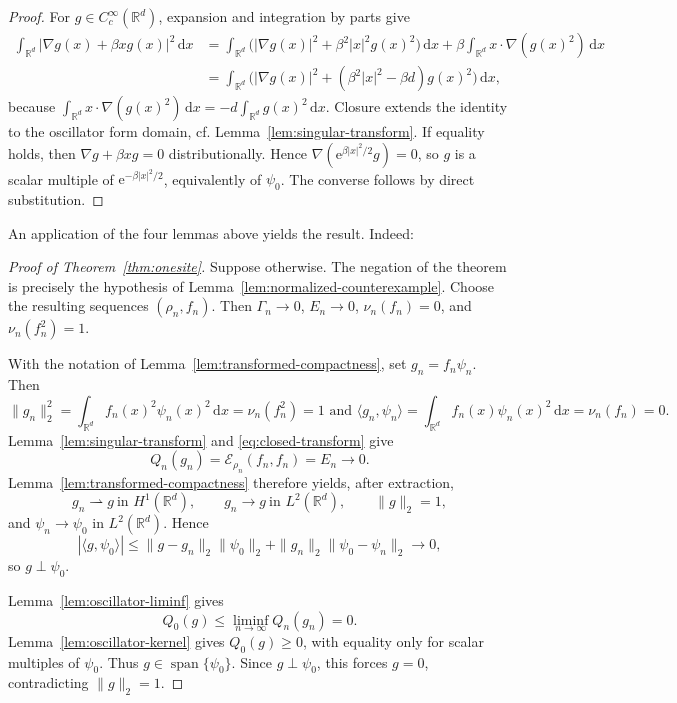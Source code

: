 \documentclass[12pt,reqno,letterpaper]{amsart}
\theoremstyle{definition}
\theoremstyle{remark}
\numberwithin{equation}{section}
\newcommand{\R}{\mathbb R}
\newcommand{\dd}{\,\mathrm d}
\newcommand{\ee}{\mathrm e}
\newcommand{\be}{\beta}
\newcommand{\cE}{\mathcal E}
\begin{document}
\begin{proof}
For \(g\in C_c^\infty(\R^d)\), expansion and integration by parts give
\begin{align*}
 \int_{\R^d}|\nabla g(x)+\be xg(x)|^2\dd x
 &=\int_{\R^d}\bigl(|\nabla g(x)|^2+\be^2|x|^2g(x)^2\bigr)\dd x+\be\int_{\R^d}x\cdot\nabla(g(x)^2)\dd x\\
 &=\int_{\R^d}\bigl(|\nabla g(x)|^2+
   (\be^2|x|^2-\be d)g(x)^2\bigr)\dd x,
\end{align*}
because
\(\int_{\R^d}x\cdot\nabla(g(x)^2)\dd x
=-d\int_{\R^d}g(x)^2\dd x\).  Closure extends the identity to the
oscillator form domain, cf. Lemma~\ref{lem:singular-transform}.  If equality holds, then
\(\nabla g+\be xg=0\) distributionally.  Hence
\(\nabla(\ee^{\be|x|^2/2}g)=0\), so \(g\) is a scalar multiple of
\(\ee^{-\be|x|^2/2}\), equivalently of \(\psi_0\).  The converse follows
by direct substitution.
\end{proof}

An application of the four lemmas above yields the result. Indeed: 

\begin{proof}[Proof of Theorem~\ref{thm:onesite}]
Suppose otherwise.  The negation of the theorem is precisely the hypothesis
of Lemma~\ref{lem:normalized-counterexample}.  Choose the resulting sequences
\((\rho_n,f_n)\).  Then \(\Gamma_n\to0\), \(E_n\to0\),
\(\nu_n(f_n)=0\), and \(\nu_n(f_n^2)=1\).

With the notation of Lemma~\ref{lem:transformed-compactness}, set
\(g_n=f_n\psi_n\).  Then
\[
 \|g_n\|_2^2
 =\int_{\R^d}f_n(x)^2\psi_n(x)^2\dd x
 =\nu_n(f_n^2)=1
\text{ and }
 \langle g_n,\psi_n\rangle
 =\int_{\R^d}f_n(x)\psi_n(x)^2\dd x
 =\nu_n(f_n)=0.
\]
Lemma~\ref{lem:singular-transform} and \eqref{eq:closed-transform} give
\[
 Q_n(g_n)=\cE_{\rho_n}(f_n,f_n)=E_n\longrightarrow0.
\]
Lemma~\ref{lem:transformed-compactness} therefore yields, after extraction,
\[
 g_n\rightharpoonup g\ \text{in }H^1(\R^d),\qquad
 g_n\to g\ \text{in }L^2(\R^d),\qquad
 \|g\|_2=1,
\]
and \(\psi_n\to\psi_0\) in \(L^2(\R^d)\).  Hence
\[
 |\langle g,\psi_0\rangle|
 \le\|g-g_n\|_2\|\psi_0\|_2
 +\|g_n\|_2\|\psi_0-\psi_n\|_2\longrightarrow0,
\]
so \(g\perp\psi_0\).

Lemma~\ref{lem:oscillator-liminf} gives
\[
 Q_0(g)\le\liminf_{n\to\infty}Q_n(g_n)=0.
\]
Lemma~\ref{lem:oscillator-kernel} gives \(Q_0(g)\ge0\), with equality only
for scalar multiples of \(\psi_0\).  Thus \(g\in\operatorname{span}\{\psi_0\}\).
Since \(g\perp\psi_0\), this forces \(g=0\), contradicting \(\|g\|_2=1\).
\end{proof}
\end{document}
